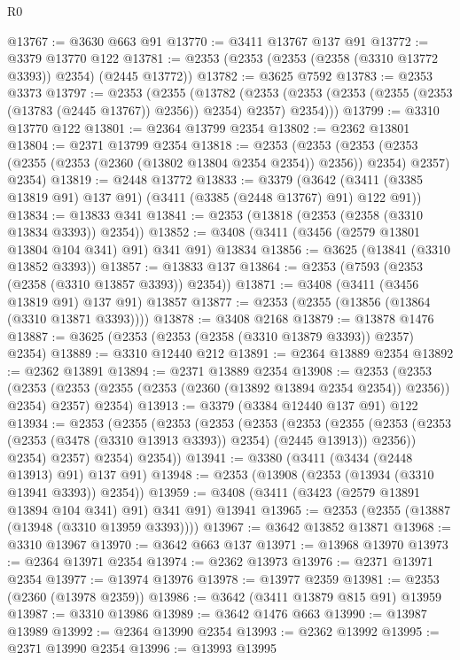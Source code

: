 \begin{lexlean}{R0}
\begin{coremodule}
@13767 := @3630 @663 @91
@13770 := @3411 @13767 @137 @91
@13772 := @3379 @13770 @122
@13781 := @2353 (@2353 (@2353 (@2358 (@3310 @13772 @3393)) @2354) (@2445 @13772))
@13782 := @3625 @7592
@13783 := @2353 @3373
@13797 := @2353
    (@2355
      (@13782
        (@2353 (@2353 (@2353 (@2355 (@2353 (@13783 (@2445 @13767)) @2356)) @2354) @2357) @2354)))
@13799 := @3310 @13770 @122
@13801 := @2364 @13799 @2354
@13802 := @2362 @13801
@13804 := @2371 @13799 @2354
@13818 := @2353
    (@2353
      (@2353 (@2353 (@2355 (@2353 (@2360 (@13802 @13804 @2354 @2354)) @2356)) @2354) @2357)
      @2354)
@13819 := @2448 @13772
@13833 := @3379
    (@3642 (@3411 (@3385 @13819 @91) @137 @91) (@3411 (@3385 (@2448 @13767) @91) @122 @91))
@13834 := @13833 @341
@13841 := @2353 (@13818 (@2353 (@2358 (@3310 @13834 @3393)) @2354))
@13852 := @3408 (@3411 (@3456 (@2579 @13801 @13804 @104 @341) @91) @341 @91) @13834
@13856 := @3625 (@13841 (@3310 @13852 @3393))
@13857 := @13833 @137
@13864 := @2353 (@7593 (@2353 (@2358 (@3310 @13857 @3393)) @2354))
@13871 := @3408 (@3411 (@3456 @13819 @91) @137 @91) @13857
@13877 := @2353 (@2355 (@13856 (@13864 (@3310 @13871 @3393))))
@13878 := @3408 @2168
@13879 := @13878 @1476
@13887 := @3625 (@2353 (@2353 (@2358 (@3310 @13879 @3393)) @2357) @2354)
@13889 := @3310 @12440 @212
@13891 := @2364 @13889 @2354
@13892 := @2362 @13891
@13894 := @2371 @13889 @2354
@13908 := @2353
    (@2353
      (@2353 (@2353 (@2355 (@2353 (@2360 (@13892 @13894 @2354 @2354)) @2356)) @2354) @2357)
      @2354)
@13913 := @3379 (@3384 @12440 @137 @91) @122
@13934 := @2353
    (@2355
      (@2353
        (@2353
          (@2353
            (@2353
              (@2355
                (@2353 (@2353 (@2353 (@3478 (@3310 @13913 @3393)) @2354) (@2445 @13913)) @2356))
              @2354)
            @2357)
          @2354)
        @2354))
@13941 := @3380 (@3411 (@3434 (@2448 @13913) @91) @137 @91)
@13948 := @2353 (@13908 (@2353 (@13934 (@3310 @13941 @3393)) @2354))
@13959 := @3408 (@3411 (@3423 (@2579 @13891 @13894 @104 @341) @91) @341 @91) @13941
@13965 := @2353 (@2355 (@13887 (@13948 (@3310 @13959 @3393))))
@13967 := @3642 @13852 @13871
@13968 := @3310 @13967
@13970 := @3642 @663 @137
@13971 := @13968 @13970
@13973 := @2364 @13971 @2354
@13974 := @2362 @13973
@13976 := @2371 @13971 @2354
@13977 := @13974 @13976
@13978 := @13977 @2359
@13981 := @2353 (@2360 (@13978 @2359))
@13986 := @3642 (@3411 @13879 @815 @91) @13959
@13987 := @3310 @13986
@13989 := @3642 @1476 @663
@13990 := @13987 @13989
@13992 := @2364 @13990 @2354
@13993 := @2362 @13992
@13995 := @2371 @13990 @2354
@13996 := @13993 @13995

\end{coremodule}
\end{lexlean}
